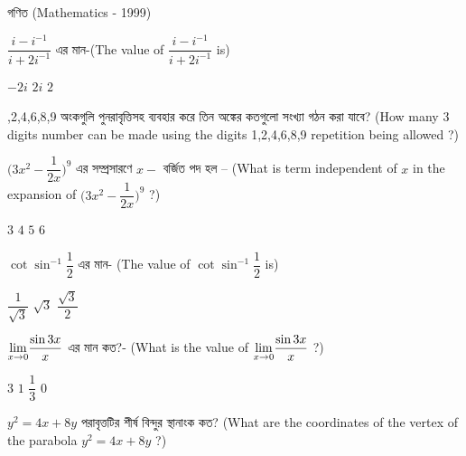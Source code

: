 \documentclass[addpoints]{exam}
\begin{document}
\begin{LARGE}
\begin{center}
গণিত (Mathematics - 1999)
\end{center}
\end{LARGE}
\begin{questions}

\question $ \dfrac{i-i^{-1}}{i+2i^{-1}} $ এর মান-(The value of $ \dfrac{i-i^{-1}}{i+2i^{-1}} $ is)  

\begin{oneparchoices}
\choice $ -2i $
\choice $ 2i $
\choice $ 2 $

\end{oneparchoices}

,2,4,6,8,9  অংকগুলি পুনরাবৃত্তিসহ ব্যবহার করে তিন অঙ্কের কতগুলো সংখ্যা গঠন করা যাবে? (How many 3 digits number can be made using the digits 1,2,4,6,8,9 repetition being allowed ?)

\begin{oneparchoices}
\end{oneparchoices}

\question $ \Bigg(3x^{2} - \dfrac{1}{2x} \Bigg)^{9} $ এর সম্প্রসারণে $ x- $ বর্জিত পদ হল – (What is term independent of $ x $ in the expansion of $ \Bigg(3x^{2} - \dfrac{1}{2x} \Bigg)^{9} $ ?)

\begin{oneparchoices}
\choice $ 3 $
\choice $ 4 $
\choice $ 5 $
\choice  $ 6 $
\end{oneparchoices}

\question  $ \cot\sin^{-1}\dfrac{1}{2} $ এর মান- (The value of  $ \cot\sin^{-1}\dfrac{1}{2} $ is)

\begin{oneparchoices}
\choice  $ \dfrac{1}{\sqrt{3}} $
\choice  $ \sqrt{3} $
\choice  $ \dfrac{\sqrt{3}}{2} $
\end{oneparchoices}

\question $ \mathlarger{\lim_{x\to 0}}\dfrac{\sin 3x}{x} $ এর মান কত?- (What is the value of  $ \mathlarger{\lim_{x\to 0}}\dfrac{\sin 3x}{x} $ ?)

\begin{oneparchoices}
\choice $ 3 $
\choice  $ 1 $
\choice $ \dfrac{1}{3} $
\choice $ 0 $  
\end{oneparchoices}

\question  $ y^{2} = 4x+8y $ পরাবৃত্তটির শীর্ষ বিন্দুর স্থানাংক কত? (What are the coordinates of the vertex of the parabola $ y^{2} = 4x+8y $ ?)


\end{questions}
\end{document}
